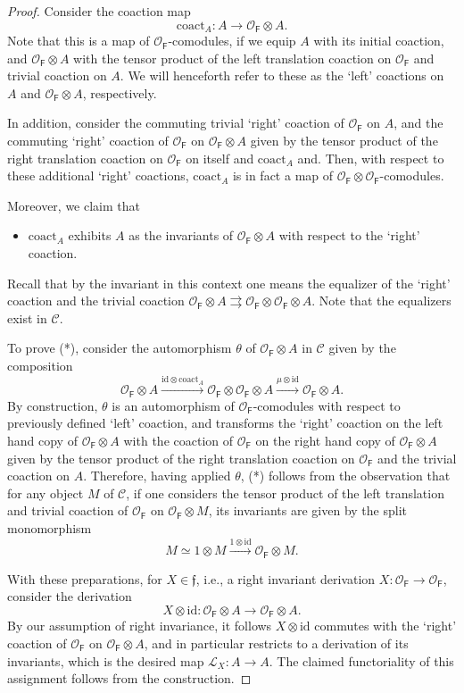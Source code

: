 \documentclass{amsart}
\theoremstyle{definition}
\newcommand{\OOF}{\OO_{\mathsf{F}}}
\newcommand{\sC}{\mathscr{C}}
\newcommand{\OO}{\mathscr{O}}
\newcommand{\on}{\mathrm}
\newcommand{\ff}{\mathfrak{f}}
\numberwithin{equation}{section}
\begin{document}
\begin{proof} Consider the coaction map 
$$\on{coact}_A: A \rightarrow  \OOF \otimes A.$$
Note that this is a map of $\OOF$-comodules, if we equip $A$ with its initial coaction, and ${\OOF} \otimes A$ with the tensor product of the left translation coaction on ${\OOF}$ and trivial coaction on $A$. We will henceforth refer to these as the `left' coactions on $A$ and $\OOF \otimes A$, respectively. 

In addition, consider the commuting trivial `right' coaction of $\OOF$ on $A$, and the commuting `right' coaction of $\OOF$ on $\OOF \otimes A$ given by the tensor product of the right translation coaction on $\OOF$ on itself and $\on{coact}_A$ and. Then, with respect to these additional `right' coactions, $\on{coact}_A$ is in fact a map of $\OOF \otimes \OOF$-comodules. 

Moreover, we claim that 
\begin{itemize}
\item[(*)]
$\on{coact}_A$ exhibits $A$ as the invariants of $\OOF \otimes A$ with respect to the `right' coaction. \end{itemize}
Recall that by the invariant in this context one means  the equalizer of the `right' coaction and the trivial coaction $\OOF \otimes A \rightrightarrows \OOF \otimes \OOF \otimes A$. Note that the equalizers exist in $\mathscr{C}$.

To prove (*),  consider the automorphism $\theta$ of $\OOF \otimes A$ in $\sC$ given by the composition
$$\OOF \otimes A \xrightarrow{\on{id} \otimes \on{coact}_A} \OOF \otimes \OOF \otimes A \xrightarrow{\mu \otimes \on{id}} \OOF \otimes A.$$
By construction, $\theta$ is an automorphism of $\OOF$-comodules with respect to previously defined `left' coaction, and transforms the `right' coaction on the left hand copy of $\OOF \otimes A$
 with the coaction of $\OOF$ on the right hand copy of $\OOF \otimes A$ given by  the tensor 
product of the right translation coaction on $\OOF$ and the trivial coaction on $A$. Therefore, having applied $\theta$, (*) follows from the observation that for any object $M$ of $\sC$, if one considers the tensor product of the left translation and trivial coaction of $\OOF$ on $\OOF \otimes M$, its invariants are given by the split monomorphism $$M \simeq 1 \otimes M \xrightarrow{1 \otimes \on{id}} \OOF \otimes M.$$

With these preparations, for $X \in \ff$, i.e., a right invariant derivation $X: \OOF \rightarrow \OOF$, consider the derivation
$$X \otimes \on{id}: \OOF \otimes A \rightarrow \OOF \otimes A.$$
By our assumption of right invariance, it follows $X \otimes \on{id}$ commutes with the `right' coaction of $\OOF$ on $\OOF \otimes A$, and in particular restricts to a derivation of its invariants, which is the desired map 
$\mathscr{L}_X: A \rightarrow A.$ The claimed functoriality of this assignment follows from the construction. 
\end{proof}
\end{document}
